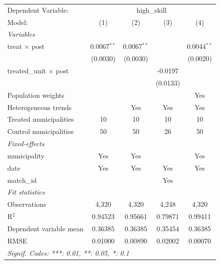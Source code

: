
\begingroup
\centering
\begin{tabular}{lcccc}
   \tabularnewline \midrule \midrule
   Dependent Variable: & \multicolumn{4}{c}{high\_skill}\\
   Model:                        & (1)           & (2)           & (3)      & (4)\\  
   \midrule
   \emph{Variables}\\
   treat $\times$ post           & 0.0067$^{**}$ & 0.0067$^{**}$ &          & 0.0044$^{**}$\\   
                                 & (0.0030)      & (0.0030)      &          & (0.0020)\\   
   treated\_unit $\times$ post   &               &               & -0.0197  &   \\   
                                 &               &               & (0.0133) &   \\   
   Population weights            &               &               &          & Yes\\  
   Heterogeneous trends          &               & Yes           & Yes      & Yes\\  
   Treated municipalities        & 10            & 10            & 10       & 10\\  
   Control municipalities        & 50            & 50            & 26       & 50\\  
   \midrule
   \emph{Fixed-effects}\\
   municipality                  & Yes           & Yes           &          & Yes\\  
   date                          & Yes           & Yes           & Yes      & Yes\\  
   match\_id                     &               &               & Yes      & \\  
   \midrule
   \emph{Fit statistics}\\
   Observations                  & 4,320         & 4,320         & 4,248    & 4,320\\  
   R$^2$                         & 0.94523       & 0.95661       & 0.79871  & 0.99411\\  
   Dependent variable mean       & 0.36385       & 0.36385       & 0.35454  & 0.36385\\  
   RMSE                          & 0.01000       & 0.00890       & 0.02002  & 0.00070\\  
   \midrule \midrule
   \multicolumn{5}{l}{\emph{Signif. Codes: ***: 0.01, **: 0.05, *: 0.1}}\\
\end{tabular}
\par\endgroup


